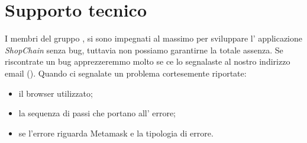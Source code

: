 \section{Supporto tecnico}\label{section:supporto_tecnico}
I membri del gruppo \groupName{}, si sono impegnati al massimo per sviluppare l' applicazione \textit{ShopChain} senza bug, tuttavia non possiamo garantirne la totale assenza.
Se riscontrate un bug apprezzeremmo molto se ce lo segnalaste al nostro indirizzo email (\groupEmail{}).
Quando ci segnalate un problema cortesemente riportate:
\begin{itemize}
    \item il browser utilizzato;
    \item la sequenza di passi che portano all' errore;
    \item se l'errore riguarda Metamask e la tipologia di errore.
\end{itemize}
